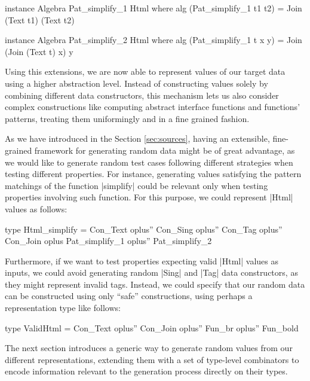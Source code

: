 \begin{code}
instance Algebra Pat_simplify_1 Html where
  alg (Pat_simplify_1 t1 t2) = Join (Text t1) (Text t2)

instance Algebra Pat_simplify_2 Html where
  alg (Pat_simplify_1 t x y) = Join (Join (Text t) x) y
\end{code}


%
%
Using this extensions, we are now able to represent values of our target data
using a higher abstraction level.
%
Instead of constructing values solely by combining different data constructors,
this mechanism lets us also consider complex constructions like computing
abstract interface functions and functions' patterns, treating them uniformingly
and in a fine grained fashion.


As we have introduced in the Section \ref{sec:sources}, having an extensible,
fine-grained framework for generating random data might be of great advantage,
as we would like to generate random test cases following different strategies
when testing different properties.
%
For instance, generating values satisfying the pattern matchings of the function
|simplify| could be relevant only when testing properties involving such
function.
%
For this purpose, we could represent |Html| values as follows:
%
\begin{code}
type Html_simplify  =      Con_Text oplus'' Con_Sing oplus'' Con_Tag oplus'' Con_Join
                    oplus  Pat_simplify_1 oplus'' Pat_simplify_2
\end{code}


%
Furthermore, if we want to test properties expecting valid |Html| values as
inputs, we could avoid generating random |Sing| and |Tag| data constructors, as
they might represent invalid tags.
%
Instead, we could specify that our random data can be constructed using only
``safe'' constructions, using perhaps a representation type like follows:

\begin{code}
type ValidHtml = Con_Text oplus'' Con_Join oplus'' Fun_br oplus'' Fun_bold
\end{code}


The next section introduces a generic way to generate random values from our
different representations, extending them with a set of type-level combinators
to encode information relevant to the generation process directly on their
types.
